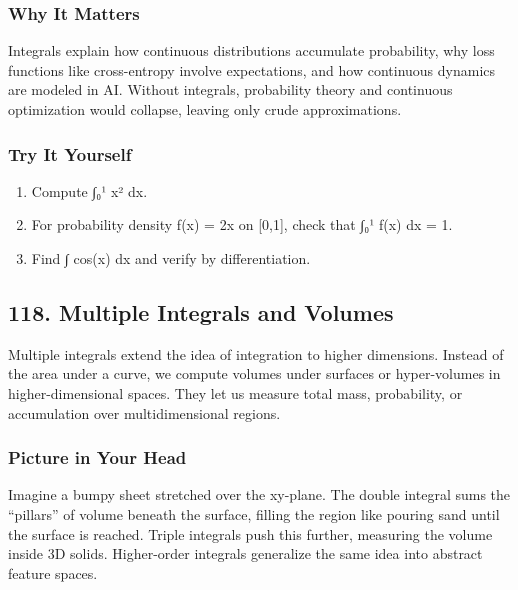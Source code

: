 \documentclass[
  letterpaper,
  DIV=11,
  numbers=noendperiod]{scrreprt}
\providecommand{\tightlist}{%
  \setlength{\itemsep}{0pt}\setlength{\parskip}{0pt}}
\begin{document}
\subsubsection{Why It Matters}\label{why-it-matters-14}

Integrals explain how continuous distributions accumulate probability,
why loss functions like cross-entropy involve expectations, and how
continuous dynamics are modeled in AI. Without integrals, probability
theory and continuous optimization would collapse, leaving only crude
approximations.

\subsubsection{Try It Yourself}\label{try-it-yourself-116}

\begin{enumerate}
\def\labelenumi{\arabic{enumi}.}
\tightlist
\item
  Compute ∫₀¹ x² dx.
\item
  For probability density f(x) = 2x on {[}0,1{]}, check that ∫₀¹ f(x) dx
  = 1.
\item
  Find ∫ cos(x) dx and verify by differentiation.
\end{enumerate}

\subsection{118. Multiple Integrals and
Volumes}\label{multiple-integrals-and-volumes}

Multiple integrals extend the idea of integration to higher dimensions.
Instead of the area under a curve, we compute volumes under surfaces or
hyper-volumes in higher-dimensional spaces. They let us measure total
mass, probability, or accumulation over multidimensional regions.

\subsubsection{Picture in Your Head}\label{picture-in-your-head-117}

Imagine a bumpy sheet stretched over the xy-plane. The double integral
sums the ``pillars'' of volume beneath the surface, filling the region
like pouring sand until the surface is reached. Triple integrals push
this further, measuring the volume inside 3D solids. Higher-order
integrals generalize the same idea into abstract feature spaces.
\end{document}
